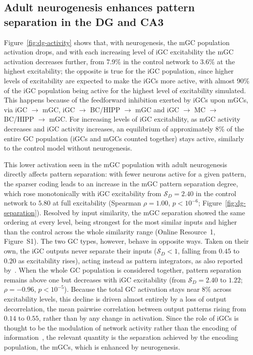 \documentclass[pdflatex,sn-basic]{sn-jnl}%
\theoremstyle{thmstyleone}%
\theoremstyle{thmstyletwo}%
\theoremstyle{thmstylethree}%
\begin{document}
\subsection{Adult neurogenesis enhances pattern separation in the DG and CA3}\label{sec:res_separation}


Figure~\ref{fig:dg-activity} shows that, with neurogenesis, the mGC population activation drops, and with each increasing level of
iGC excitability the mGC activation decreases further, from 7.9\% in the control network to 3.6\% at the highest excitability; the
opposite is true for the iGC population, since higher levels of excitability are expected to make the iGCs more active, with
almost 90\% of the iGC population being active for the highest level of excitability simulated. This happens because of the
feedforward inhibition exerted by iGCs upon mGCs, via iGC $\to$ mGC, iGC $\to$ BC/HIPP $\to$ mGC and iGC $\to$ MC $\to$ BC/HIPP
$\to$ mGC\@. For increasing levels of iGC excitability, as mGC activity decreases and iGC activity increases, an equilibrium of
approximately 8\% of the entire GC population (iGCs and mGCs counted together) stays active, similarly to the control model
without neurogenesis.

This lower activation seen in the mGC population with adult neurogenesis directly affects pattern separation: with fewer neurons
active for a given pattern, the sparser coding leads to an increase in the mGC pattern separation degree, which rose monotonically
with iGC excitability from $\mathcal{S}_D = 2.40$ in the control network to $5.80$ at full excitability (Spearman $\rho = 1.00$,
$p < 10^{-6}$; Figure~\ref{fig:dg-separation}). Resolved by input similarity, the mGC separation showed the same ordering at every
level, being strongest for the most similar inputs and higher than the control across the whole similarity range (Online
Resource~1, Figure~S1). The two GC types, however, behave in opposite ways. Taken on their own, the iGC outputs never
separate their inputs ($\mathcal{S}_D < 1$, falling from $0.45$ to $0.20$ as excitability rises), acting instead as pattern
integrators, as also reported by~\citet{kimEffect2024}. When the whole GC population is considered together, pattern
separation remains above one but decreases with iGC excitability (from $\mathcal{S}_D = 2.40$ to $1.22$; $\rho = -0.96$, $p <
10^{-5}$). Because the total GC activation stays near 8\% across excitability levels, this decline is driven almost
entirely by a loss of output decorrelation, the mean pairwise correlation between output patterns rising from $0.14$ to $0.55$,
rather than by any change in activation. Since the role of iGCs is thought to be the modulation of network activity rather than
the encoding of information~\citep{mchughAdultborn2022, folszAdultborn2023}, the relevant quantity is the separation achieved by
the encoding population, the mGCs, which is enhanced by neurogenesis.
\end{document}
